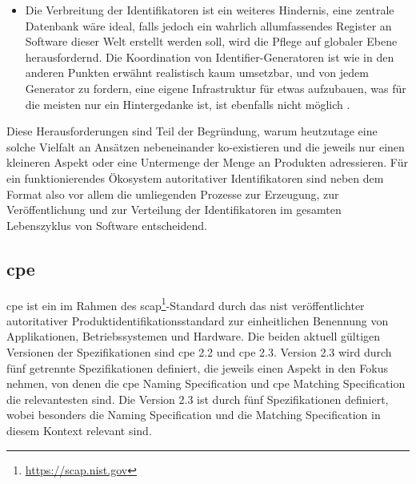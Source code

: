 \begin{itemize}
    \item Die Verbreitung der Identifikatoren ist ein weiteres Hindernis, eine zentrale Datenbank wäre ideal, falls jedoch ein wahrlich allumfassendes Register an Software dieser Welt erstellt werden soll, wird die Pflege auf globaler Ebene herausfordernd.
    Die Koordination von Identifier-Generatoren ist wie in den anderen Punkten erwähnt realistisch kaum umsetzbar, und von jedem Generator zu fordern, eine eigene Infrastruktur für etwas aufzubauen, was für die meisten nur ein Hintergedanke ist, ist ebenfalls nicht möglich \autocite{CISA2023}.
\end{itemize}

Diese Herausforderungen sind Teil der Begründung, warum heutzutage eine solche Vielfalt an Ansätzen nebeneinander ko-existieren und die jeweils nur einen kleineren Aspekt oder eine Untermenge der Menge an Produkten adressieren.
Für ein funktionierendes Ökosystem autoritativer Identifikatoren sind neben dem Format also vor allem die umliegenden Prozesse zur Erzeugung, zur Veröffentlichung und zur Verteilung der Identifikatoren im gesamten Lebenszyklus von Software entscheidend.

\subsection{\acrfull{cpe}}\label{subsec:cpe-description}


\acrshort{cpe} ist ein im Rahmen des \acrfull{scap}\footnote{\url{https://scap.nist.gov}}-Standard durch das \acrshort{nist} veröffentlichter autoritativer Produktidentifikationsstandard zur einheitlichen Benennung von Applikationen, Betriebssystemen und Hardware.
Die beiden aktuell gültigen Versionen der Spezifikationen sind \acrshort{cpe} 2.2 und \acrshort{cpe} 2.3.
Version 2.3 wird durch fünf getrennte Spezifikationen definiert, die jeweils einen Aspekt in den Fokus nehmen, von denen die \acrshort{cpe} Naming Specification \autocite{Cheikes_Waltermire_Scarfone_2011} und \acrshort{cpe} Matching Specification \autocite{Parmelee_Booth_Waltermire_Scarfone_2011} die relevantesten sind.
Die Version 2.3 ist durch fünf Spezifikationen definiert, wobei besonders die Naming Specification \autocite{Cheikes_Waltermire_Scarfone_2011} und die Matching Specification \autocite{Parmelee_Booth_Waltermire_Scarfone_2011} in diesem Kontext relevant sind.

